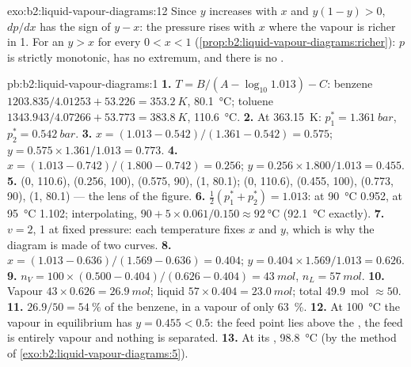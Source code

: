 \begin{solution}{exo:b2:liquid-vapour-diagrams:12}
Since $y$ increases with $x$ and $y(1 - y) > 0$, $dp/dx$ has the sign of $y - x$:
the pressure rises with $x$ where the vapour is richer in 1. For an  $y > x$ for every $0 < x < 1$ (\cref{prop:b2:liquid-vapour-diagrams:richer}):
$p$ is strictly monotonic, has no extremum, and there is no .
\end{solution}

\begin{solution}{pb:b2:liquid-vapour-diagrams:1}
\textbf{1.} $T = B/(A - \log_{10}1.013) - C$: benzene $1203.835/4.01253 + 53.226 =
\qty{353.2}{K}$, \qty{80.1}{\degreeCelsius}; toluene $1343.943/4.07266 + 53.773 =
\qty{383.8}{K}$, \qty{110.6}{\degreeCelsius}.
\textbf{2.} At \qty{363.15}{K}: $p_1^* = \qty{1.361}{bar}$, $p_2^* = \qty{0.542}{bar}$.
\textbf{3.} $x = (1.013 - 0.542)/(1.361 - 0.542) = 0.575$; $y = 0.575 \times
1.361/1.013 = 0.773$.
\textbf{4.} $x = (1.013 - 0.742)/(1.800 - 0.742) = 0.256$; $y = 0.256 \times
1.800/1.013 = 0.455$.
\textbf{5.}  (0, 110.6), (0.256, 100), (0.575, 90), (1, 80.1);  (0, 110.6), (0.455, 100), (0.773, 90), (1, 80.1) --- the lens of the
figure.
\textbf{6.} $\frac12(p_1^* + p_2^*) = 1.013$: at \qty{90}{\degreeCelsius} 0.952, at
\qty{95}{\degreeCelsius} 1.102; interpolating, $90 + 5 \times 0.061/0.150 \approx
\qty{92}{\degreeCelsius}$ (\qty{92.1}{\degreeCelsius} exactly).
\textbf{7.} $v = 2$, 1 at fixed pressure: each temperature fixes $x$ and $y$,
which is why the diagram is made of two curves.
\textbf{8.} $x = (1.013 - 0.636)/(1.569 - 0.636) = 0.404$; $y = 0.404 \times
1.569/1.013 = 0.626$.
\textbf{9.} $n_V = 100 \times (0.500 - 0.404)/(0.626 - 0.404) = \qty{43}{mol}$,
$n_L = \qty{57}{mol}$.
\textbf{10.} Vapour $43 \times 0.626 = \qty{26.9}{mol}$; liquid $57 \times 0.404
= \qty{23.0}{mol}$; total \qty{49.9}{mol} $\approx 50$.
\textbf{11.} $26.9/50 = 54~\%$ of the benzene, in a vapour of only 63~\%.
\textbf{12.} At \qty{100}{\degreeCelsius} the vapour in equilibrium has $y =
0.455 < 0.5$: the feed point lies above the , the feed is entirely
vapour and nothing is separated.
\textbf{13.} At its , \qty{98.8}{\degreeCelsius} (by the method of
\cref{exo:b2:liquid-vapour-diagrams:5}).

\end{solution}
